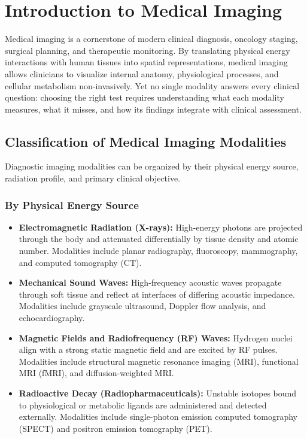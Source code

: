\chapter{Introduction to Medical Imaging}
\label{ch:intro}

Medical imaging is a cornerstone of modern clinical diagnosis, oncology staging, surgical planning, and therapeutic monitoring. By translating physical energy interactions with human tissues into spatial representations, medical imaging allows clinicians to visualize internal anatomy, physiological processes, and cellular metabolism non-invasively. Yet no single modality answers every clinical question: choosing the right test requires understanding what each modality measures, what it misses, and how its findings integrate with clinical assessment.

\section{Classification of Medical Imaging Modalities}
Diagnostic imaging modalities can be organized by their physical energy source, radiation profile, and primary clinical objective.

\subsection*{By Physical Energy Source}
\begin{itemize}
\item \textbf{Electromagnetic Radiation (X-rays):} High-energy photons are projected through the body and attenuated differentially by tissue density and atomic number. Modalities include planar radiography, fluoroscopy, mammography, and computed tomography (CT).
\item \textbf{Mechanical Sound Waves:} High-frequency acoustic waves propagate through soft tissue and reflect at interfaces of differing acoustic impedance. Modalities include grayscale ultrasound, Doppler flow analysis, and echocardiography.
\item \textbf{Magnetic Fields and Radiofrequency (RF) Waves:} Hydrogen nuclei align with a strong static magnetic field and are excited by RF pulses. Modalities include structural magnetic resonance imaging (MRI), functional MRI (fMRI), and diffusion-weighted MRI.
\item \textbf{Radioactive Decay (Radiopharmaceuticals):} Unstable isotopes bound to physiological or metabolic ligands are administered and detected externally. Modalities include single-photon emission computed tomography (SPECT) and positron emission tomography (PET).
\end{itemize}

